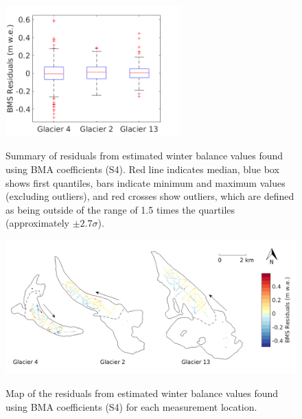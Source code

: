 \documentclass{sfuthesis}
\newcommand{\boxMatlab}{Red line indicates median, blue box shows first quantiles, bars indicate minimum and maximum values (excluding outliers), and red crosses show outliers, which are defined as being outside of the range of 1.5 times the quartiles (approximately $\pm2.7\sigma$). }
\begin{document}
\begin{figure}[H]
\centering
	\includegraphics[width =0.6\textwidth]{residuals_box_BMS.png}\\
\caption{Summary of residuals from estimated winter balance values found using BMA coefficients (S4). \boxMatlab}
\label{fig:BMAresidualsboxplot}
\end{figure} 

\begin{figure}[H]
	\centering
	\includegraphics[width =\textwidth]{residualsMap_BMS.png}\\
	\caption{Map of the residuals from estimated winter balance values found using BMA coefficients (S4) for each measurement location.}
	\label{fig:BMS_residualsMap}
\end{figure} 
\end{document}
